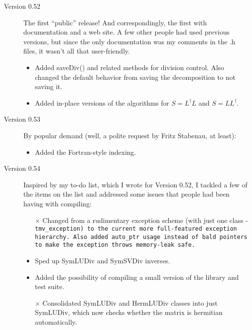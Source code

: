 \begin{description}
\begin{itemize}
\end{itemize}

\item[Version 0.52]
The first ``public'' release!  And correspondingly, the first with documentation
and a web site.  A few other people had used previous versions, but since the
only documentation was my comments in the .h files, it wasn't all that user-friendly.

\begin{itemize}

\item
Added saveDiv() and related methods for division control.  Also changed the 
default behavior from saving the decomposition to not saving it.

\item
Added in-place versions of the algorithms for $S = L^\dagger L$ and $S = L L^\dagger$.

\end{itemize}

\item[Version 0.53]
By popular demand (well, a polite request by Fritz Stabenau, at least):

\begin{itemize}

\item
Added the Fortran-style indexing.

\end{itemize}

\item[Version 0.54]
Inspired by my to-do list, which I wrote for Version 0.52, I tackled a few of the 
items on the list and addressed some issues that people had been having
with compiling:

\begin{itemize}

\item[$\times$]
Changed from a rudimentary exception scheme (with just one class - 
\tt{tmv\_exception}) to the current more full-featured exception hierarchy.
Also added \tt{auto\_ptr} usage instead of bald pointers to make the 
exception throws memory-leak safe.

\item
Sped up SymLUDiv and SymSVDiv inverses.

\item
Added the possibility of compiling a small version of the library and test suite.

\item[$\times$]
Consolidated SymLUDiv and HermLUDiv classes into just SymLUDiv, which now checks
whether the matrix is hermitian automatically.  


\end{itemize}
\end{description}
